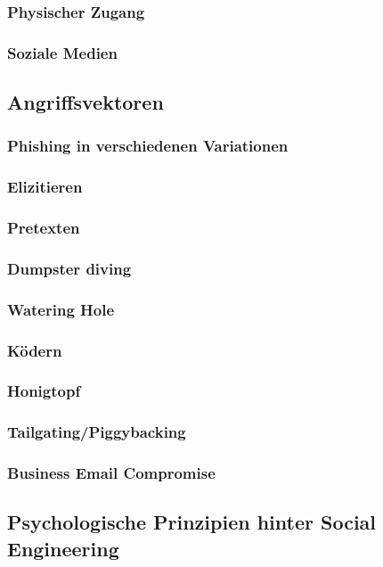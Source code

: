 \subsubsection{Physischer Zugang}
\subsubsection{Soziale Medien}
\subsection{Angriffsvektoren}

\subsubsection{Phishing in verschiedenen Variationen}
\subsubsection{Elizitieren}
\subsubsection{Pretexten}
\subsubsection{Dumpster diving}
\subsubsection{Watering Hole}
\subsubsection{Ködern}
\subsubsection{Honigtopf}
\subsubsection{Tailgating/Piggybacking}
\subsubsection{Business Email Compromise}

\subsection{Psychologische Prinzipien hinter Social Engineering}

